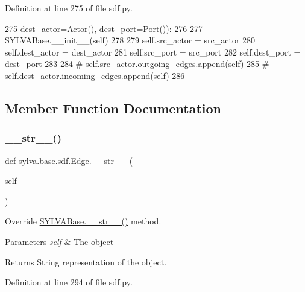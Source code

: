 Definition at line 275 of file sdf.\+py.


\begin{DoxyCode}
275                  dest\_actor=Actor(), dest\_port=Port()):
276 
277         SYLVABase.\_\_init\_\_(self)
278 
279         self.src\_actor = src\_actor
280         self.dest\_actor = dest\_actor
281         self.src\_port = src\_port
282         self.dest\_port = dest\_port
283 
284         \textcolor{comment}{# self.src\_actor.outgoing\_edges.append(self)}
285         \textcolor{comment}{# self.dest\_actor.incoming\_edges.append(self)}
286 
\end{DoxyCode}


\subsection{Member Function Documentation}
\mbox{\label{classsylva_1_1base_1_1sdf_1_1_edge_a0e573f4c878817df6cf77283137df6d2}} 
\subsubsection{\texorpdfstring{\+\_\+\+\_\+str\+\_\+\+\_\+()}{\_\_str\_\_()}}
{\footnotesize\ttfamily def sylva.\+base.\+sdf.\+Edge.\+\_\+\+\_\+str\+\_\+\+\_\+ (\begin{DoxyParamCaption}\item[{}]{self }\end{DoxyParamCaption})}



Override \hyperlink{classsylva_1_1base_1_1sylva__base_1_1_s_y_l_v_a_base_a6c1ed8e83c61ea8a6035b5e4460989f3}{S\+Y\+L\+V\+A\+Base.\+\_\+\+\_\+str\+\_\+\+\_\+()} method. 


\begin{DoxyParams}{Parameters}
{\em self} & The object\\
\hline
\end{DoxyParams}
\begin{DoxyReturn}{Returns}
String representation of the object. 
\end{DoxyReturn}


Definition at line 294 of file sdf.\+py.



